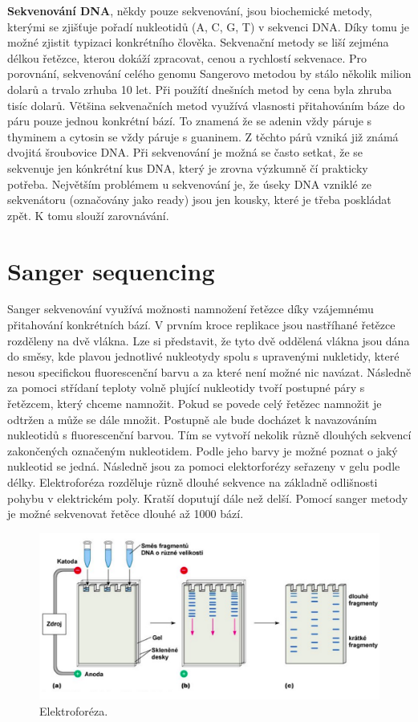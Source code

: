 \documentclass[czech,DP]{thesiskiv}
\numberwithin{equation}{section}
\begin{document}
\noindent
\textbf{Sekvenování DNA}, někdy pouze sekvenování, jsou biochemické metody, kterými se zjišťuje pořadí nukleotidů (A, C, G, T) v sekvenci DNA. Díky tomu je možné zjistit typizaci konkrétního člověka. Sekvenační metody se liší zejména délkou řetězce, kterou dokáží zpracovat, cenou a rychlostí sekvenace. Pro porovnání, sekvenování celého genomu Sangerovo metodou by stálo několik milion dolarů a trvalo zrhuba 10 let. Při použítí dnešních metod by cena byla zhruba tisíc dolarů. Většina sekvenačních metod využívá vlasnosti přitahováním báze do páru pouze jednou konkrétní bází. To znamená že se adenin vždy páruje s thyminem a cytosin se vždy páruje s guaninem. Z těchto párů vzniká již známá dvojitá šroubovice DNA. Při sekvenování je možná se často setkat, že se sekvenuje jen kónkrétní kus DNA, který je zrovna výzkumně čí prakticky potřeba. Největším problémem u sekvenování je, že úseky DNA vzniklé ze sekvenátoru (označovány jako ready) jsou jen kousky, které je třeba poskládat zpět. K tomu slouží zarovnávání. \cite{sekvenovani_ziva} 


\section{Sanger sequencing}
Sanger sekvenování využívá možnosti namnožení řetězce díky vzájemnému přitahování konkrétních bází. V prvním kroce replikace jsou nastříhané řetězce rozděleny na dvě vlákna. Lze si představit, že tyto dvě oddělená vlákna jsou dána do směsy, kde plavou jednotlivé nukleotydy spolu s upravenými nukletidy, které nesou specifickou fluorescenční barvu a za které není možné nic navázat. Následně za pomoci střídaní teploty volně plující nukleotidy tvoří postupné páry s řetězcem, který chceme namnožit. Pokud se povede celý řetězec namnožit je odtržen a může se dále množit. Postupně ale bude docházet k navazováním nukleotidů s fluorescenční barvou. Tím se vytvoří nekolik různě dlouhých sekvencí zakončených označeným nukleotidem. Podle jeho barvy je možné poznat o jaký nukleotid se jedná. Následně jsou za pomoci elektorforézy seřazeny v gelu podle délky. Elektroforéza rozděluje různě dlouhé sekvence na základně odlišnosti pohybu v elektrickém poly. Kratší doputují dále než delší. Pomocí sanger metody je možné sekvenovat řetěce dlouhé až 1000 bází.   

\begin{figure}[H]		
		\centering
		\includegraphics[width=\textwidth]{./img/elektroforeza.png}
		\caption{Elektroforéza. \cite{elektroforeza_img}}
		\label{fig:elektroforeza}
\end{figure}
 
\end{document}

